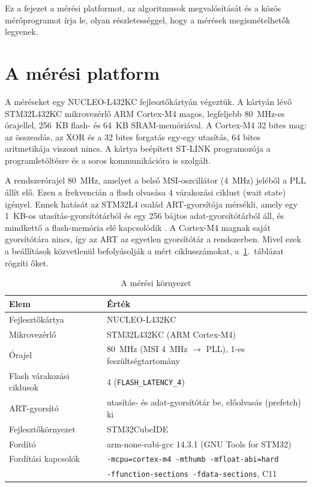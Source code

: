\documentclass[a4paper,12pt]{report}
\theoremstyle{definition}
\theoremstyle{remark}
\begin{document}
Ez a fejezet a mérési platformot, az algoritmusok megvalósítását és a közös mérőprogramot írja le, olyan részletességgel, hogy a mérések megismételhetők legyenek.

\section{A mérési platform}\label{sec:platform}

A méréseket egy NUCLEO-L432KC fejlesztőkártyán végeztük. A kártyán lévő STM32L432KC mikrovezérlő ARM Cortex-M4 magos, legfeljebb 80~MHz-es órajellel, 256~KB flash- és 64~KB SRAM-memóriával. A Cortex-M4 32 bites mag: az összeadás, az XOR és a 32 bites forgatás egy-egy utasítás, 64 bites aritmetikája viszont nincs. A kártya beépített ST-LINK programozója a programletöltésre és a soros kommunikációra is szolgált.

A rendszerórajel 80~MHz, amelyet a belső MSI-oszcillátor (4~MHz) jeléből a PLL állít elő. Ezen a frekvencián a flash olvasása 4 várakozási ciklust (wait state) igényel. Ennek hatását az STM32L4 család ART-gyorsítója mérsékli, amely egy 1~KB-os utasítás-gyorsítótárból és egy 256 bájtos adat-gyorsítótárból áll, és mindkettő a flash-memória elé kapcsolódik \cite{RM0394}. A Cortex-M4 magnak saját gyorsítótára nincs, így az ART az egyetlen gyorsítótár a rendszerben. Mivel ezek a beállítások közvetlenül befolyásolják a mért ciklusszámokat, a~\ref{tab:platform}.~táblázat rögzíti őket.

\begin{table}[htbp]
	\centering
	\small
	\caption{A mérési környezet}
	\label{tab:platform}
	\begin{tabular}{|l|l|}
		\hline
		\textbf{Elem} & \textbf{Érték} \\ \hline
		Fejlesztőkártya & NUCLEO-L432KC \\ \hline
		Mikrovezérlő & STM32L432KC (ARM Cortex-M4) \\ \hline
		Órajel & 80~MHz (MSI 4~MHz $\rightarrow$ PLL), 1-es feszültségtartomány \\ \hline
		Flash várakozási ciklusok & 4 (\texttt{FLASH\_LATENCY\_4}) \\ \hline
		ART-gyorsító & utasítás- és adat-gyorsítótár be, előolvasás (prefetch) ki \\ \hline
		Fejlesztőkörnyezet & STM32CubeIDE %
		\\ \hline
		Fordító & arm-none-eabi-gcc 14.3.1 (GNU Tools for STM32) \\ \hline
		Fordítási kapcsolók & \texttt{-mcpu=cortex-m4 -mthumb -mfloat-abi=hard} \\
		& \texttt{-ffunction-sections -fdata-sections}, C11 \\ \hline
	\end{tabular}
\end{table}
\end{document}
